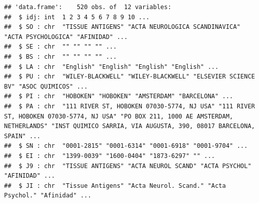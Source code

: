 \documentclass[
]{book}
\newenvironment{Shaded}{\begin{snugshade}}{\end{snugshade}}
\newcommand{\FunctionTok}[1]{\textcolor[rgb]{0.13,0.29,0.53}{\textbf{#1}}}
\newcommand{\NormalTok}[1]{#1}
\newcommand{\OtherTok}[1]{\textcolor[rgb]{0.56,0.35,0.01}{#1}}
\newcommand{\SpecialCharTok}[1]{\textcolor[rgb]{0.81,0.36,0.00}{\textbf{#1}}}
\newcommand{\StringTok}[1]{\textcolor[rgb]{0.31,0.60,0.02}{#1}}
\theoremstyle{break}
\theoremstyle{nonumberplain}
\begin{document}
\begin{verbatim}
## 'data.frame':    520 obs. of  12 variables:
##  $ idj: int  1 2 3 4 5 6 7 8 9 10 ...
##  $ SO : chr  "TISSUE ANTIGENS" "ACTA NEUROLOGICA SCANDINAVICA" "ACTA PSYCHOLOGICA" "AFINIDAD" ...
##  $ SE : chr  "" "" "" "" ...
##  $ BS : chr  "" "" "" "" ...
##  $ LA : chr  "English" "English" "English" "English" ...
##  $ PU : chr  "WILEY-BLACKWELL" "WILEY-BLACKWELL" "ELSEVIER SCIENCE BV" "ASOC QUIMICOS" ...
##  $ PI : chr  "HOBOKEN" "HOBOKEN" "AMSTERDAM" "BARCELONA" ...
##  $ PA : chr  "111 RIVER ST, HOBOKEN 07030-5774, NJ USA" "111 RIVER ST, HOBOKEN 07030-5774, NJ USA" "PO BOX 211, 1000 AE AMSTERDAM, NETHERLANDS" "INST QUIMICO SARRIA, VIA AUGUSTA, 390, 08017 BARCELONA, SPAIN" ...
##  $ SN : chr  "0001-2815" "0001-6314" "0001-6918" "0001-9704" ...
##  $ EI : chr  "1399-0039" "1600-0404" "1873-6297" "" ...
##  $ J9 : chr  "TISSUE ANTIGENS" "ACTA NEUROL SCAND" "ACTA PSYCHOL" "AFINIDAD" ...
##  $ JI : chr  "Tissue Antigens" "Acta Neurol. Scand." "Acta Psychol." "Afinidad" ...
\end{verbatim}

\begin{Shaded}
\end{Shaded}
\end{document}
